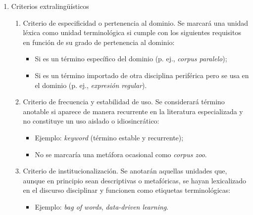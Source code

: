 \begin{enumerate}
\begin{enumerate}
        \item Criterio de incrustación y jerarquía. Cuando un término compuesto contiene dentro de sí otros términos reconocibles, se anotan tanto la cadena completa como sus subunidades si estas también son relevantes como términos:
        \begin{itemize}
            \item Ejemplo: en \textit{part-of-speech tagging} se anotan tanto \textit{part-of-speech tagging} como \textit{part-of-speech}.
            \item Ejemplo: en \textit{lexical bundle extraction} se anotan tanto \textit{lexical bundle} como \textit{extraction}.
        \end{itemize}
    \end{enumerate}
    \item{Criterios extralingüísticos}
    \begin{enumerate}
        \item Criterio de especificidad o pertenencia al dominio. Se marcará una unidad léxica como unidad terminológica si cumple con los siguientes requisitos en función de su grado de pertenencia al dominio:
        \begin{itemize}
            \item Si es un término específico del dominio (p. ej., \textit{corpus paralelo});
            \item Si es un término importado de otra disciplina periférica pero se usa en el dominio (p. ej., \textit{expresión regular}).
        \end{itemize}

        \item Criterio de frecuencia y estabilidad de uso. Se considerará término anotable si aparece de manera recurrente en la literatura especializada y no constituye un uso aislado o idiosincrático:
        \begin{itemize}
            \item Ejemplo: \textit{keyword} (término estable y recurrente);
            \item No se marcaría una metáfora ocasional como \textit{corpus zoo}.
        \end{itemize}

        \item Criterio de institucionalización. Se anotarán aquellas unidades que, aunque en principio sean descriptivas o metafóricas, se hayan lexicalizado en el discurso disciplinar y funcionen como etiquetas terminológicas:
        \begin{itemize}
            \item Ejemplo: \textit{bag of words}, \textit{data-driven learning}.
        \end{itemize}
    \end{enumerate}
\end{enumerate}


